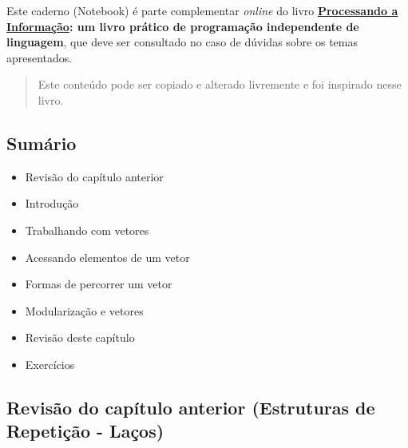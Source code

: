 \documentclass[12pt,a4paper]{article}
\providecommand{\tightlist}{%
      \setlength{\itemsep}{0pt}\setlength{\parskip}{0pt}}
\begin{document}
Este caderno (Notebook) é parte complementar \emph{online} do livro
\textbf{\href{https://editora.ufabc.edu.br/matematica-e-ciencias-da-computacao/58-processando-a-informacao}{Processando
a Informação}: um livro prático de programação independente de
linguagem}, que deve ser consultado no caso de dúvidas sobre os temas
apresentados.

\begin{quote}
Este conteúdo pode ser copiado e alterado livremente e foi inspirado
nesse livro.
\end{quote}

    \hypertarget{sumuxe1rio}{%
\subsection{Sumário}\label{sumuxe1rio}}

\begin{itemize}
\tightlist
\item
  Revisão do capítulo anterior
\item
  Introdução
\item
  Trabalhando com vetores
\item
  Acessando elementos de um vetor
\item
  Formas de percorrer um vetor
\item
  Modularização e vetores
\item
  Revisão deste capítulo
\item
  Exercícios
\end{itemize}

    \hypertarget{revisuxe3o-do-capuxedtulo-anterior-estruturas-de-repetiuxe7uxe3o---lauxe7os}{%
\subsection{Revisão do capítulo anterior (Estruturas de Repetição -
Laços)}\label{revisuxe3o-do-capuxedtulo-anterior-estruturas-de-repetiuxe7uxe3o---lauxe7os}}
\end{document}
